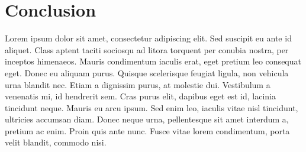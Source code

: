 \section{Conclusion}

Lorem ipsum dolor sit amet, consectetur adipiscing elit. Sed suscipit eu ante id aliquet. Class aptent taciti sociosqu ad litora torquent per conubia nostra, per inceptos himenaeos. Mauris condimentum iaculis erat, eget pretium leo consequat eget. Donec eu aliquam purus. Quisque scelerisque feugiat ligula, non vehicula urna blandit nec. Etiam a dignissim purus, at molestie dui. Vestibulum a venenatis mi, id hendrerit sem. Cras purus elit, dapibus eget est id, lacinia tincidunt neque. Mauris eu arcu ipsum. Sed enim leo, iaculis vitae nisl tincidunt, ultricies accumsan diam. Donec neque urna, pellentesque sit amet interdum a, pretium ac enim. Proin quis ante nunc. Fusce vitae lorem condimentum, porta velit blandit, commodo nisi.
